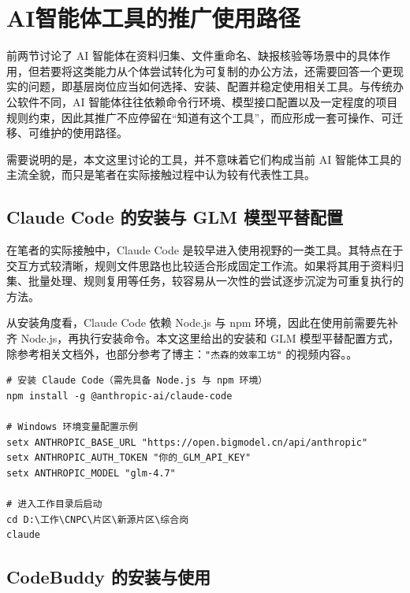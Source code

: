 \section{AI智能体工具的推广使用路径}

前两节讨论了 AI 智能体在资料归集、文件重命名、缺报核验等场景中的具体作用，但若要将这类能力从个体尝试转化为可复制的办公方法，还需要回答一个更现实的问题，即基层岗位应当如何选择、安装、配置并稳定使用相关工具。与传统办公软件不同，AI 智能体往往依赖命令行环境、模型接口配置以及一定程度的项目规则约束，因此其推广不应停留在“知道有这个工具”，而应形成一套可操作、可迁移、可维护的使用路径。

需要说明的是，本文这里讨论的工具，并不意味着它们构成当前 AI 智能体工具的主流全貌，而只是笔者在实际接触过程中认为较有代表性工具。

\subsection{Claude Code 的安装与 GLM 模型平替配置}

在笔者的实际接触中，Claude Code 是较早进入使用视野的一类工具。其特点在于交互方式较清晰，规则文件思路也比较适合形成固定工作流。如果将其用于资料归集、批量处理、规则复用等任务，较容易从一次性的尝试逐步沉淀为可重复执行的方法。

从安装角度看，Claude Code 依赖 Node.js 与 npm 环境，因此在使用前需要先补齐 Node.js，再执行安装命令。本文这里给出的安装和 GLM 模型平替配置方式，除参考相关文档外，也部分参考了博主：\lstinline|"杰森的效率工坊"| 的视频内容。\cite{youtube_obsidian_claude_skill_2024,zai_claude_code_2026}。

\begin{codeexample}[htbp]
   \caption{Claude Code 安装与环境变量配置示例}
   \begin{lstlisting}[style=cmdview]
# 安装 Claude Code（需先具备 Node.js 与 npm 环境）
npm install -g @anthropic-ai/claude-code

# Windows 环境变量配置示例
setx ANTHROPIC_BASE_URL "https://open.bigmodel.cn/api/anthropic"
setx ANTHROPIC_AUTH_TOKEN "你的_GLM_API_KEY"
setx ANTHROPIC_MODEL "glm-4.7"

# 进入工作目录后启动
cd D:\工作\CNPC\片区\新源片区\综合岗
claude
\end{lstlisting}
\end{codeexample}

\subsection{CodeBuddy 的安装与使用}

